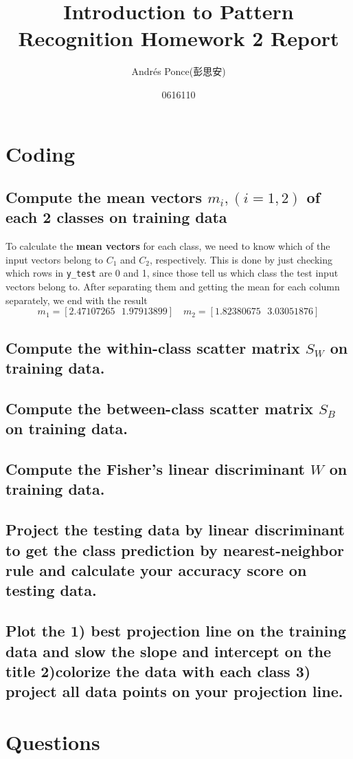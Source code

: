 \documentclass{article}
\title{Introduction to Pattern Recognition Homework 2 Report}
\author{Andr\'es Ponce(彭思安) \\
\and
0616110}
\begin{document}
\maketitle
\section{Coding}
	\subsection{Compute the mean vectors $m_{i},(i=1,2)$ of each 2 classes on training data}
		To calculate the \textbf{mean vectors} for each class, we need to know which of the 
		input vectors belong to $C_{1}$ and $C_{2}$, respectively. This is done by just checking
		which rows in \texttt{y\_test} are 0 and 1, since those tell us which class the test input
		vectors belong to. After separating them and getting the mean for each column separately,
		we end with the result
		\[ m_{1} = [2.47107265 \textrm{ } 1.97913899]\quad m_{2} = [1.82380675 \textrm{ } 3.03051876]\]
	\subsection{Compute the within-class scatter matrix $S_{W}$ on training data.}
	\subsection{Compute the between-class scatter matrix $S_{B}$ on training data.}
	\subsection{Compute the Fisher's linear discriminant $W$ on training data.}
	\subsection{Project the testing data by linear discriminant to get the class prediction by
		nearest-neighbor rule and calculate your accuracy score on testing data.}
	\subsection{Plot the \textbf{1) best projection line} on the training data and slow the slope
		and intercept on the title \textbf{2)colorize the data} with each class \textbf{3) project
		all data points on your projection line}.}
\section{Questions}
\end{document}
